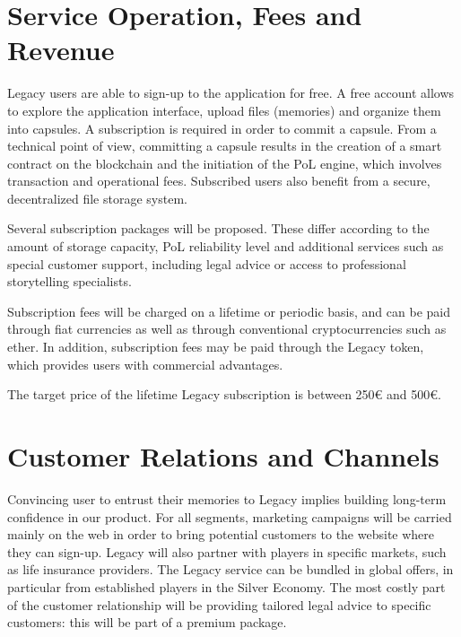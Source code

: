 \section{Service Operation, Fees and Revenue} %
\label{sec:service_operation_fees_and_revenue}
Legacy users are able to sign-up to the application for free. A free account allows to explore the application interface, upload files (memories) and organize them into capsules. A subscription is required in order to commit a capsule. From a technical point of view, committing a capsule results in the creation of a smart contract on the blockchain and the initiation of the PoL engine, which involves transaction and operational fees. Subscribed users also benefit from a secure, decentralized file storage system.

Several subscription packages will be proposed. These differ according to the amount of storage capacity, PoL reliability level and additional services such as special customer support, including legal advice or access to professional storytelling specialists.

Subscription fees will be charged on a lifetime or periodic basis, and can be paid through fiat currencies as well as through conventional cryptocurrencies such as ether. In addition, subscription fees may be paid through the Legacy token, which provides users with commercial advantages.

The target price of the lifetime Legacy subscription is between 250€ and 500€.

\section{Customer Relations and Channels} %
\label{sec:customer_relations_and_channels}
Convincing user to entrust their memories to Legacy implies building long-term confidence in our product.
For all segments, marketing campaigns will be carried mainly on the web in order to bring potential customers to the website where they can sign-up.
Legacy will also partner with players in specific markets, such as life insurance providers. The Legacy service can be bundled in global offers, in particular from established players in the Silver Economy.
The most costly part of the customer relationship will be providing tailored legal advice to specific customers: this will be part of a premium package.


